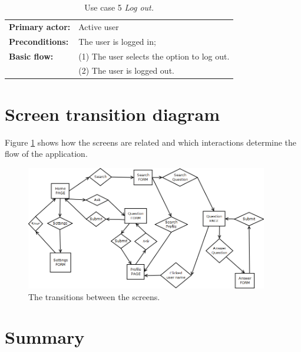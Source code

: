 \begin{table}[ht]
\caption{Use case 5 \textit{Log out.}}
\begin{center}
	\begin{tabular}{ l p{300px} }
		\hline
		\textbf{Primary actor:}	& Active user \\

		\textbf{Preconditions:}		& The user is logged in; \\

		\textbf{Basic flow:}			& (1) The user selects the option to log out. \\
															& (2) The user is logged out. \\
		\hline
	\end{tabular}
\end{center}
\label{table:use_case5}
\end{table}



\section{Screen transition diagram}\label{section:screen_transitions}

Figure \ref{figure:screen_transition_diagram} shows how the screens are related and which interactions determine the flow of the application.

\begin{figure}
	\begin{center}
		\includegraphics[width=400px]{img/screen_transition_diagram}
	\end{center}
	\caption{The transitions between the screens.}
	\label{figure:screen_transition_diagram}
\end{figure}





\section{Summary}

